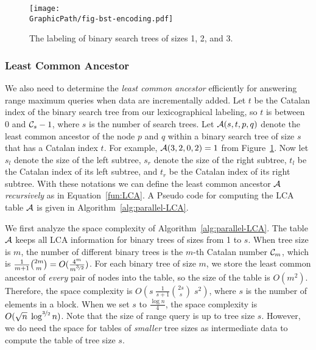 \begin{figure}[!thb]
  \centering
  \texttt{[image: \\GraphicPath/fig-bst-encoding.pdf]}
  \caption{The labeling of binary search trees of sizes 1, 2, and 3.}
  \label{fig:labelingBST}
\end{figure}

\subsubsection{Least Common Ancestor}

We also need to determine the {\em least common ancestor} efficiently
for answering range maximum queries when data are incrementally added.
Let $t$ be the Catalan index of the binary search tree from our
lexicographical labeling, so $t$ is between 0 and ${\cal C}_s-1$, where
$s$ is the number of search trees.  Let ${\cal A}(s, t, p, q)$ denote
the least common ancestor of the node $p$ and $q$ within a binary search
tree of size $s$ that has a Catalan index $t$.  For example, ${\cal
A}(3, 2, 0, 2) = 1$ from Figure~\ref{fig:labelingBST}.  Now let $s_l$
denote the size of the left subtree, $s_r$ denote the size of the right
subtree, $t_l$ be the Catalan index of its left subtree, and $t_r$ be
the Catalan index of its right subtree.  With these notations we can
define the least common ancestor $\cal A$ {\em recursively} as in
Equation~\ref{fun:LCA}.  A Pseudo code for computing the LCA table $\cal
A$ is given in Algorithm~\ref{alg:parallel-LCA}.





We first analyze the space complexity of
Algorithm~\ref{alg:parallel-LCA}.  The table $\cal A$ keeps all LCA
information for binary trees of sizes from 1 to $s$.  When tree size is
$m$, the number of different binary trees is the $m$-th Catalan number
${\cal C}_m$, which is
$\frac{1}{m+1}\binom{2m}{m}=O(\frac{4^m}{m^{\nicefrac{3}{2}}})$. For
each binary tree of size $m$, we store the least common ancestor of {\em
every} pair of nodes into the table, so the size of the table is
$O(m^2)$. Therefore, the space complexity is $O(s \;
\frac{1}{s+1}\binom{2s}{s} \; s^2)$, where $s$ is the number of elements
in a block.  When we set $s$ to $\frac{\log n}{4}$, the space complexity
is $O(\sqrt{n} \;
\log^{\nicefrac{3}{2}} n)$.  Note that the size of range query is up to
tree size $s$.  However, we do need the space for tables of {\em
smaller} tree sizes as intermediate data to compute the table of tree
size $s$.

